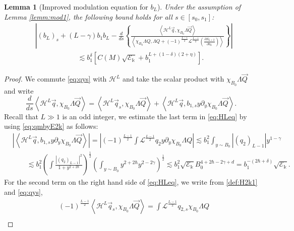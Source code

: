 \documentclass[11pt]{aims}
\newtheorem{lemma}[theorem]{Lemma}
\theoremstyle{definition}
\numberwithin{equation}{section}
\begin{document}
\begin{lemma}[Improved modulation equation for $b_L$] \label{lemm:mod2} Under the assumption of Lemma \ref{lemm:mod1}, the following bound holds for all $s \in [s_0, s_1]$:
\begin{align}
&\left|(b_L)_s + (L - \gamma)b_1b_L - \frac{d}{ds} \left\{ \frac{\left<{\mathscr{H}}^L \vec q, \chi_{B_0}\Lambda \vec Q\right>}{\left<\chi_{B_0}\Lambda Q,\Lambda Q  +  (-1)^{\frac{L - 1}2} {\mathscr{L}}^{\frac{L-1}2}\left(\frac{\partial S_{L+2}}{\partial b_L} \right)\right>}\right\}\right|\nonumber\\
& \qquad \qquad \qquad \lesssim  b_1^\delta \left[C(M)\sqrt{{\mathcal{E}}_{\Bbbk}} + b_1^{L + (1 - \delta)(2 + \eta)}\right].\label{eq:ODEbLimproved}
\end{align}
\end{lemma}
\begin{proof} We commute  \eqref{eq:qys} with ${\mathscr{H}}^L$ and take the scalar product with $\chi_{B_0}\Lambda \vec Q$ and write
\begin{equation}\label{eq:HLeq}
\frac{d}{ds} \left<{\mathscr{H}}^L \vec q, \chi_{B_0} \Lambda \vec Q\right> = \left<{\mathscr{H}}^L \vec q_s, \chi_{B_0} \Lambda \vec Q\right> + \left<{\mathscr{H}}^L \vec q, b_{1,s} y{\partial_y} \chi_{B_0}\Lambda \vec Q \right>.
\end{equation}
Recall that $L\gg 1$ is an odd integer, we estimate the last term in \eqref{eq:HLeq} by using \eqref{eq:qmbyE2k} as follows:
\begin{align*}
&\left| \left<{\mathscr{H}}^L \vec q, b_{1,s} y{\partial_y} \chi_{B_0}\Lambda \vec Q \right>\right| = \left|(-1)^{\frac{L - 1}{2}}\int {\mathscr{L}}^{\frac{L-1}{2}}q_2 y{\partial_y} \chi_{B_0}\Lambda Q \right| \lesssim b_1^2 \int_{y \sim B_0}|(q_2)_{L-1}| y^{1 - \gamma}\\
& \qquad \lesssim b_1^2 \left(\int \frac{|(q_2)_{L-1}|^2}{1  + y^{2 + 2\hbar}} \right)^\frac{1}{2}\left(\int_{y \sim B_0}y^{2 + 2\hbar}y^{2- 2\gamma} \right)^\frac{1}{2}\lesssim b_1^2\sqrt{{\mathscr{E}}_\Bbbk}B_0^{4 + 2\hbar - 2\gamma + d} = b_1^{-(2\hbar  + \delta)}\sqrt{{\mathscr{E}}_\Bbbk}.
\end{align*}
For the second term on the right hand side of \eqref{eq:HLeq}, we write from \eqref{def:H2k1} and \eqref{eq:qys}, 
\begin{align}
&(-1)^{\frac{L - 1}{2}}\left<{\mathscr{H}}^L \vec q_s, \chi_{B_0} \Lambda \vec Q\right> = \int {\mathscr{L}}^{\frac{L-1}{2}}q_{2,s}\chi_{B_0}\Lambda Q \label{eq:Hsq2} \\

\end{align}
\end{proof}
\end{document}
